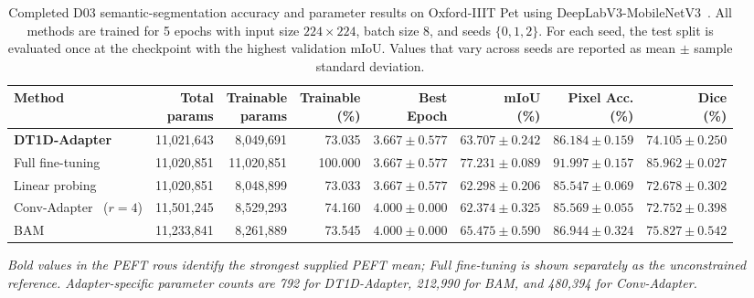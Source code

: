 \documentclass[pdflatex,sn-mathphys-num]{sn-jnl}
\theoremstyle{thmstyleone}
\theoremstyle{thmstyletwo}
\theoremstyle{thmstylethree}
\begin{document}
\begin{table}[!htbp]
\centering
\caption{Completed D03 semantic-segmentation accuracy and parameter results on Oxford-IIIT Pet using DeepLabV3-MobileNetV3~\cite{chen2018deeplab,howard2017mobilenet}. All methods are trained for 5 epochs with input size $224\times224$, batch size 8, and seeds $\{0,1,2\}$. For each seed, the test split is evaluated once at the checkpoint with the highest validation mIoU. Values that vary across seeds are reported as mean $\pm$ sample standard deviation.}
\label{tab:seg_pet_deeplabv3_accuracy}
\scriptsize
\setlength{\tabcolsep}{3pt}
\renewcommand{\arraystretch}{1.12}
\begin{tabularx}{\linewidth}{@{}Xrrrrrrr@{}}
\toprule
\textbf{Method} &
\makecell{\textbf{Total}\\\textbf{params}} &
\makecell{\textbf{Trainable}\\\textbf{params}} &
\makecell{\textbf{Trainable}\\\textbf{(\%)}} &
\makecell{\textbf{Best}\\\textbf{Epoch}} &
\makecell{\textbf{mIoU}\\\textbf{(\%)}} &
\makecell{\textbf{Pixel Acc.}\\\textbf{(\%)}} &
\makecell{\textbf{Dice}\\\textbf{(\%)}} \\
\midrule
\textbf{DT1D-Adapter} & 11,021,643 & 8,049,691 & 73.035 & $3.667\pm0.577$ & $63.707\pm0.242$ & $86.184\pm0.159$ & $74.105\pm0.250$ \\
Full fine-tuning & 11,020,851 & 11,020,851 & 100.000 & $3.667\pm0.577$ & $\mathbf{77.231\pm0.089}$ & $\mathbf{91.997\pm0.157}$ & $\mathbf{85.962\pm0.027}$ \\
Linear probing & 11,020,851 & 8,048,899 & 73.033 & $3.667\pm0.577$ & $62.298\pm0.206$ & $85.547\pm0.069$ & $72.678\pm0.302$ \\
Conv-Adapter~\cite{chen2024convadapter} ($r=4$) & 11,501,245 & 8,529,293 & 74.160 & $4.000\pm0.000$ & $62.374\pm0.325$ & $85.569\pm0.055$ & $72.752\pm0.398$ \\
BAM~\cite{park2020lightweightattention} & 11,233,841 & 8,261,889 & 73.545 & $4.000\pm0.000$ & $\mathbf{65.475\pm0.590}$ & $\mathbf{86.944\pm0.324}$ & $\mathbf{75.827\pm0.542}$ \\
\bottomrule
\end{tabularx}

\vspace{2pt}
{\footnotesize\textit{Bold values in the PEFT rows identify the strongest supplied PEFT mean; Full fine-tuning is shown separately as the unconstrained reference. Adapter-specific parameter counts are 792 for DT1D-Adapter, 212,990 for BAM, and 480,394 for Conv-Adapter.}}
\end{table}
\end{document}
